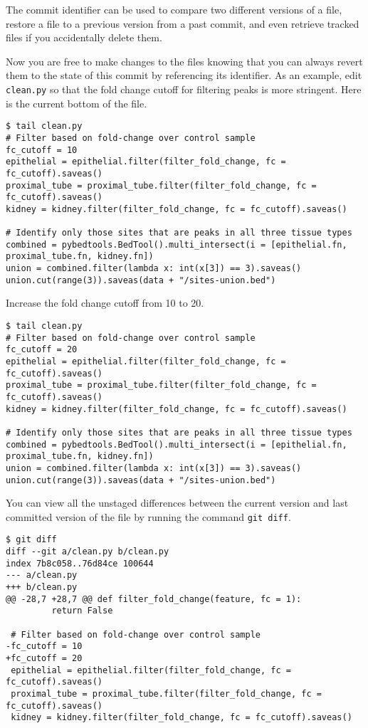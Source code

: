 The commit identifier can be used to compare two different versions of a file, restore a file to a previous version from a past commit, and even retrieve tracked files if you accidentally delete them.

Now you are free to make changes to the files knowing that you can always revert them to the state of this commit by referencing its identifier.
As an example, edit \verb|clean.py| so that the fold change cutoff for filtering peaks is more stringent.
Here is the current bottom of the file.

\begin{verbatim}
$ tail clean.py
# Filter based on fold-change over control sample
fc_cutoff = 10
epithelial = epithelial.filter(filter_fold_change, fc = fc_cutoff).saveas()
proximal_tube = proximal_tube.filter(filter_fold_change, fc = fc_cutoff).saveas()
kidney = kidney.filter(filter_fold_change, fc = fc_cutoff).saveas()

# Identify only those sites that are peaks in all three tissue types
combined = pybedtools.BedTool().multi_intersect(i = [epithelial.fn, proximal_tube.fn, kidney.fn])
union = combined.filter(lambda x: int(x[3]) == 3).saveas()
union.cut(range(3)).saveas(data + "/sites-union.bed")
\end{verbatim}

Increase the fold change cutoff from 10 to 20.

\begin{verbatim}
$ tail clean.py
# Filter based on fold-change over control sample
fc_cutoff = 20
epithelial = epithelial.filter(filter_fold_change, fc = fc_cutoff).saveas()
proximal_tube = proximal_tube.filter(filter_fold_change, fc = fc_cutoff).saveas()
kidney = kidney.filter(filter_fold_change, fc = fc_cutoff).saveas()

# Identify only those sites that are peaks in all three tissue types
combined = pybedtools.BedTool().multi_intersect(i = [epithelial.fn, proximal_tube.fn, kidney.fn])
union = combined.filter(lambda x: int(x[3]) == 3).saveas()
union.cut(range(3)).saveas(data + "/sites-union.bed")
\end{verbatim}

You can view all the unstaged differences between the current version and last committed version of the file by running the command \verb|git diff|.

\begin{verbatim}
$ git diff
diff --git a/clean.py b/clean.py
index 7b8c058..76d84ce 100644
--- a/clean.py
+++ b/clean.py
@@ -28,7 +28,7 @@ def filter_fold_change(feature, fc = 1):
         return False

 # Filter based on fold-change over control sample
-fc_cutoff = 10
+fc_cutoff = 20
 epithelial = epithelial.filter(filter_fold_change, fc = fc_cutoff).saveas()
 proximal_tube = proximal_tube.filter(filter_fold_change, fc = fc_cutoff).saveas()
 kidney = kidney.filter(filter_fold_change, fc = fc_cutoff).saveas()
\end{verbatim}

